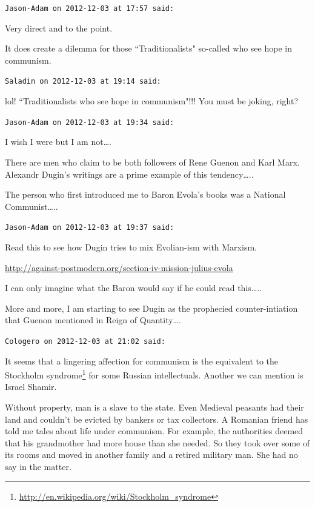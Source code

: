 \begin{footnotesize}\begin{sffamily}



\texttt{Jason-Adam on 2012-12-03 at 17:57 said: }

Very direct and to the point. 

It does create a dilemma for those ``Traditionalists" so-called who see hope in communism.


\hfill

\texttt{Saladin on 2012-12-03 at 19:14 said: }

lol! ``Traditionalists who see hope in communism"!!! You must be joking, right?


\hfill

\texttt{Jason-Adam on 2012-12-03 at 19:34 said: }

I wish I were but I am not….

There are men who claim to be both followers of Rene Guenon and Karl Marx. Alexandr Dugin's writings are a prime example of this tendency…..

The person who first introduced me to Baron Evola's books was a National Communist…..


\hfill

\texttt{Jason-Adam on 2012-12-03 at 19:37 said: }

Read this to see how Dugin tries to mix Evolian-ism with Marxism.

\url{http://against-postmodern.org/section-iv-mission-julius-evola}

I can only imagine what the Baron would say if he could read this…..

More and more, I am starting to see Dugin as the prophecied counter-intiation that Guenon mentioned in Reign of Quantity….


\hfill

\texttt{Cologero on 2012-12-03 at 21:02 said: }

It seems that a lingering affection for communism is the equivalent to the Stockholm syndrome\footnote{\url{http://en.wikipedia.org/wiki/Stockholm_syndrome}} for some Russian intellectuals. Another we can mention is Israel Shamir.

Without property, man is a slave to the state. Even Medieval peasants had their land and couldn't be evicted by bankers or tax collectors. A Romanian friend has told me tales about life under communism. For example, the authorities deemed that his grandmother had more house than she needed. So they took over some of its rooms and moved in another family and a retired military man. She had no say in the matter.



\end{sffamily}
\end{footnotesize}
